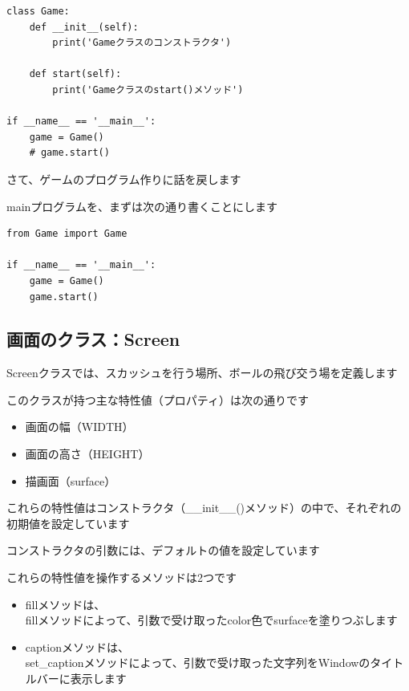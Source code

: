 \documentclass[uplatex,a4paper,11pt,oneside,openany]{jsbook}
\begin{document}
\begin{lstlisting}[caption=main.pyとGame.py,label=prog01-3]
class Game:
    def __init__(self):
        print('Gameクラスのコンストラクタ')

    def start(self):
        print('Gameクラスのstart()メソッド')

if __name__ == '__main__':
    game = Game()
    # game.start()
\end{lstlisting}%

さて、ゲームのプログラム作りに話を戻します

mainプログラムを、まずは次の通り書くことにします

\begin{lstlisting}[caption=main.py,label=p0]
from Game import Game

if __name__ == '__main__':
    game = Game()
    game.start()
\end{lstlisting}

\subsection{画面のクラス：Screen}

Screenクラスでは、スカッシュを行う場所、ボールの飛び交う場を定義します

このクラスが持つ主な特性値（プロパティ）は次の通りです

\begin{itemize}
  \item 画面の幅（WIDTH）
  \item 画面の高さ（HEIGHT）
  \item 描画面（surface）
\end{itemize}

これらの特性値はコンストラクタ（\_\_init\_\_()メソッド）の中で、それぞれの初期値を設定しています

コンストラクタの引数には、デフォルトの値を設定しています

これらの特性値を操作するメソッドは2つです

\begin{itemize}
  \item fillメソッドは、\\fillメソッドによって、引数で受け取ったcolor色でsurfaceを塗りつぶします
  \item captionメソッドは、\\set\_captionメソッドによって、引数で受け取った文字列をWindowのタイトルバーに表示します
\end{itemize}
\end{document}
